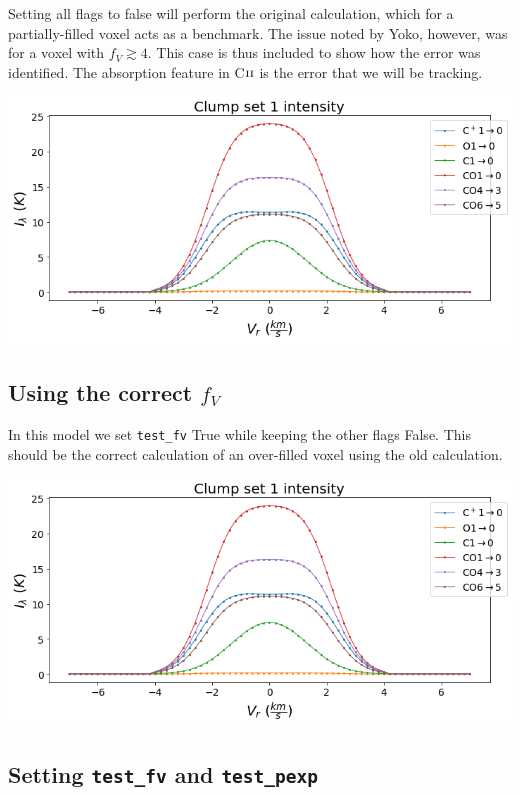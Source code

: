 \documentclass[a4paper]{article}
\newcommand{\mathsc}[1]{{\normalfont\textsc{#1}}}
\begin{document}
    Setting all flags to false will perform the original calculation, which for a partially-filled voxel acts as a benchmark.
    The issue noted by Yoko, however, was for a voxel with \(f_V \gtrsim 4\).
    This case is thus included to show how the error was identified.
    The absorption feature in C\(\mathsc{ii}\) is the error that we will be tracking.

    \includegraphics*[width=\linewidth]{voxel_error_original.png}

    \subsection{Using the correct \(f_V\)}

    In this model we set \texttt{test\_fv} True while keeping the other flags False.
    This should be the correct calculation of an over-filled voxel using the old calculation.

    \includegraphics*[width=\linewidth]{voxel_error_fv.png}

    \subsection{Setting \texttt{test\_fv} and \texttt{test\_pexp}}
\end{document}
